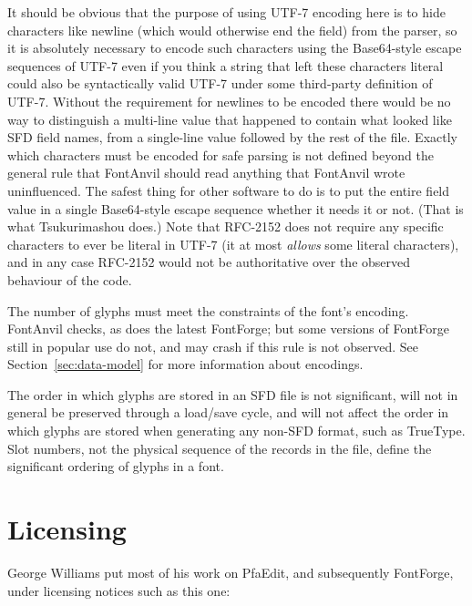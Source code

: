 \documentclass[11pt]{report}
\begin{document}
It should be obvious that the purpose of using UTF-7 encoding here is to
hide characters like newline (which would otherwise end the field) from the
parser, so it is absolutely necessary to encode such characters using the
Base64-style escape sequences of UTF-7 even if you think a string that left
these characters literal could also be syntactically valid UTF-7 under some
third-party definition of UTF-7.  Without the requirement for newlines to be
encoded there would be no way to distinguish a multi-line value that
happened to contain what looked like SFD field names, from a single-line
value followed by the rest of the file.  Exactly which characters must be
encoded for safe parsing is not defined beyond the general rule that
FontAnvil should read anything that FontAnvil wrote uninfluenced.  The
safest thing for other software to do is to put the entire field value in a
single Base64-style escape sequence whether it needs it or not.  (That is
what Tsukurimashou does.) Note that RFC-2152 does not require any specific
characters to ever be literal in UTF-7 (it at most \emph{allows} some
literal characters), and in any case RFC-2152 would not be authoritative
over the observed behaviour of the code.

The number of glyphs must meet the constraints of the font's encoding. 
FontAnvil checks, as does the latest FontForge; but some versions of
FontForge still in popular use do not, and may crash if this rule is not
observed.  See Section~\ref{sec:data-model} for more information about
encodings.

The order in which glyphs are stored in an SFD file is not significant, will
not in general be preserved through a load/save cycle, and will not affect
the order in which glyphs are stored when generating any non-SFD format,
such as TrueType.  Slot numbers, not the physical sequence of the records in
the file, define the significant ordering of glyphs in a font.

\clearpage
\fi

\chapter{Licensing}

George Williams put most of his work on PfaEdit, and subsequently FontForge,
under licensing notices such as this one:
\end{document}
